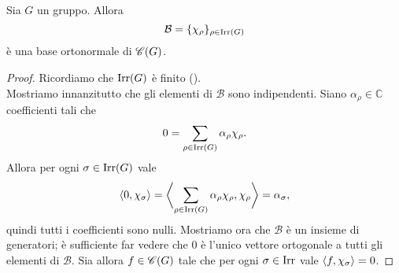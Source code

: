 \begin{proposition}
Sia $G$ un gruppo. Allora
$$
\mathcal{B}=\{\chi_\rho\}_{\rho\in\operatorname{Irr}(G)}
$$
è una base ortonormale di $\mathscr{C}(G)$.
\end{proposition}
\begin{proof}
Ricordiamo che $\operatorname{Irr}(G)$ è finito ().\\
Mostriamo innanzitutto che gli elementi di $\mathcal{B}$ sono indipendenti. Siano $\alpha_\rho\in\mathbb{C}$ coefficienti tali che
$$
0=\sum_{\rho\in\operatorname{Irr}(G)}\alpha_\rho\chi_\rho.
$$
Allora per ogni $\sigma\in\operatorname{Irr}(G)$ vale
$$
\left\langle0,\chi_\sigma\right\rangle=\biggl\langle\sum_{\rho\in\operatorname{Irr}(G)}\alpha_\rho\chi_\rho,\chi_\rho\biggr\rangle=\alpha_\sigma,
$$
quindi tutti i coefficienti sono nulli. Mostriamo ora che $\mathcal{B}$ è un insieme di generatori; è sufficiente far vedere che $0$ è l'unico vettore ortogonale a tutti gli elementi di $\mathcal{B}$. Sia allora $f\in\mathscr{C}(G)$ tale che per ogni $\sigma\in\operatorname{Irr}$ vale $\left\langle f,\chi_\sigma\right\rangle=0$.


\end{proof}
